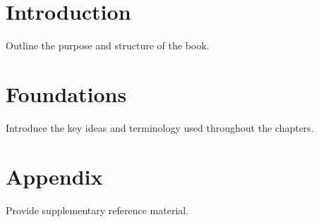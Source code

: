 \documentclass[
    language=english,
    doctype=book,
    institution=none,
    titlestyle=book
]{../../omnilatex}
\begin{document}
\frontmatter
\maketitle
\tableofcontents

\mainmatter
\chapter{Introduction}
Outline the purpose and structure of the book.

\chapter{Foundations}
Introduce the key ideas and terminology used throughout the chapters.

\appendix
\chapter{Appendix}
Provide supplementary reference material.

\backmatter
\printbibliography
\end{document}
